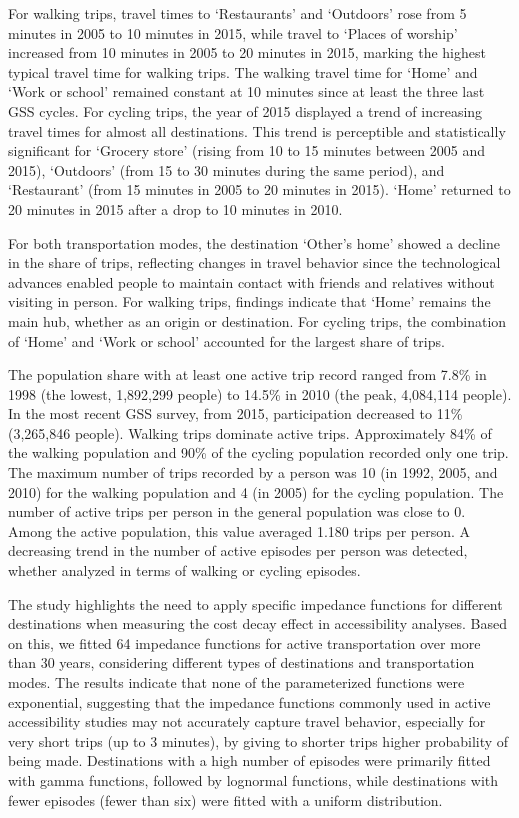 \documentclass[preprint, 3p,
authoryear]{elsarticle} %
\begin{document}
For walking trips, travel times to `Restaurants' and `Outdoors' rose
from 5 minutes in 2005 to 10 minutes in 2015, while travel to `Places of
worship' increased from 10 minutes in 2005 to 20 minutes in 2015,
marking the highest typical travel time for walking trips. The walking
travel time for `Home' and `Work or school' remained constant at 10
minutes since at least the three last GSS cycles. For cycling trips, the
year of 2015 displayed a trend of increasing travel times for almost all
destinations. This trend is perceptible and statistically significant
for `Grocery store' (rising from 10 to 15 minutes between 2005 and
2015), `Outdoors' (from 15 to 30 minutes during the same period), and
`Restaurant' (from 15 minutes in 2005 to 20 minutes in 2015). `Home'
returned to 20 minutes in 2015 after a drop to 10 minutes in 2010.

For both transportation modes, the destination `Other's home' showed a
decline in the share of trips, reflecting changes in travel behavior
since the technological advances enabled people to maintain contact with
friends and relatives without visiting in person. For walking trips,
findings indicate that `Home' remains the main hub, whether as an origin
or destination. For cycling trips, the combination of `Home' and `Work
or school' accounted for the largest share of trips.

The population share with at least one active trip record ranged from
7.8\% in 1998 (the lowest, 1,892,299 people) to 14.5\% in 2010 (the
peak, 4,084,114 people). In the most recent GSS survey, from 2015,
participation decreased to 11\% (3,265,846 people). Walking trips
dominate active trips. Approximately 84\% of the walking population and
90\% of the cycling population recorded only one trip. The maximum
number of trips recorded by a person was 10 (in 1992, 2005, and 2010)
for the walking population and 4 (in 2005) for the cycling population.
The number of active trips per person in the general population was
close to 0. Among the active population, this value averaged 1.180 trips
per person. A decreasing trend in the number of active episodes per
person was detected, whether analyzed in terms of walking or cycling
episodes.

The study highlights the need to apply specific impedance functions for
different destinations when measuring the cost decay effect in
accessibility analyses. Based on this, we fitted 64 impedance functions
for active transportation over more than 30 years, considering different
types of destinations and transportation modes. The results indicate
that none of the parameterized functions were exponential, suggesting
that the impedance functions commonly used in active accessibility
studies may not accurately capture travel behavior, especially for very
short trips (up to 3 minutes), by giving to shorter trips higher
probability of being made. Destinations with a high number of episodes
were primarily fitted with gamma functions, followed by lognormal
functions, while destinations with fewer episodes (fewer than six) were
fitted with a uniform distribution.
\end{document}
